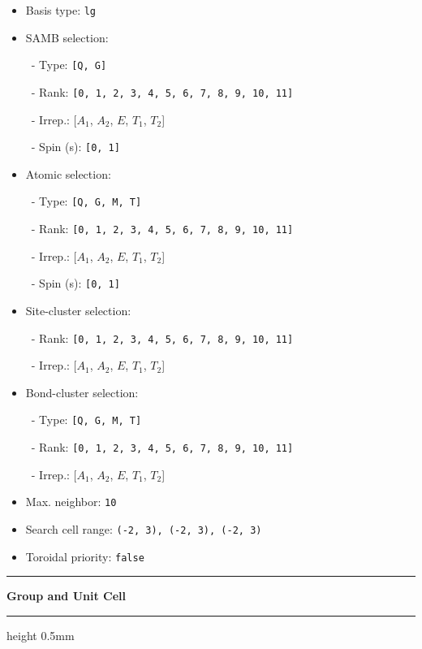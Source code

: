 \documentclass[fleqn,10pt,landscape]{jsarticle}
\begin{document}
\begin{itemize}
\item Basis type: \texttt{lg}

\item SAMB selection:

\, - Type: \texttt{[Q, G]}

\, - Rank: \texttt{[0, 1, 2, 3, 4, 5, 6, 7, 8, 9, 10, 11]}

\, - Irrep.: [$A_{1}$, $A_{2}$, $E$, $T_{1}$, $T_{2}$]

\, - Spin (s): \texttt{[0, 1]}

\item Atomic selection:

\, - Type: \texttt{[Q, G, M, T]}

\, - Rank: \texttt{[0, 1, 2, 3, 4, 5, 6, 7, 8, 9, 10, 11]}

\, - Irrep.: [$A_{1}$, $A_{2}$, $E$, $T_{1}$, $T_{2}$]

\, - Spin (s): \texttt{[0, 1]}

\item Site-cluster selection:

\, - Rank: \texttt{[0, 1, 2, 3, 4, 5, 6, 7, 8, 9, 10, 11]}

\, - Irrep.: [$A_{1}$, $A_{2}$, $E$, $T_{1}$, $T_{2}$]

\item Bond-cluster selection:

\, - Type: \texttt{[Q, G, M, T]}

\, - Rank: \texttt{[0, 1, 2, 3, 4, 5, 6, 7, 8, 9, 10, 11]}

\, - Irrep.: [$A_{1}$, $A_{2}$, $E$, $T_{1}$, $T_{2}$]

\item Max. neighbor: \texttt{10}

\item Search cell range: \texttt{(-2, 3), (-2, 3), (-2, 3)}

\item Toroidal priority: \texttt{false}

\end{itemize}
\vspace{5mm}
\noindent \rule[0.5mm]{5mm}{0.5mm}\hspace{3mm}\textbf{Group and Unit Cell}\hspace{3mm}\leaders\hrule height 0.5mm\hfill\kern0pt
\vspace{3mm}
\end{document}
